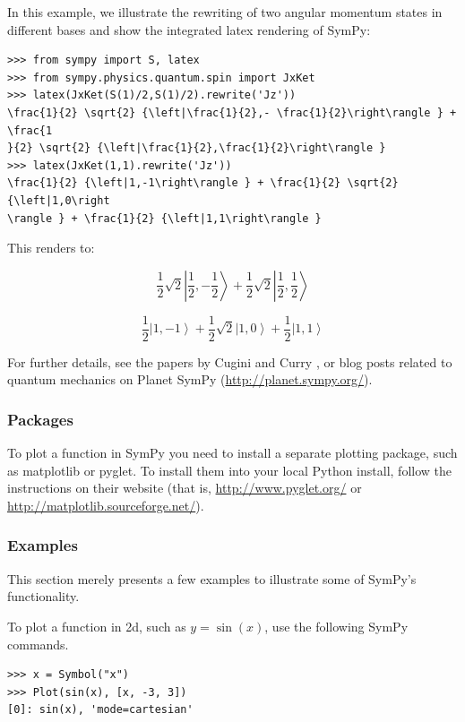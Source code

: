\documentclass[12pt]{article}
\begin{document}
In this example, we illustrate the rewriting of two angular momentum states in different
bases and show the integrated latex rendering of SymPy:

\begin{Verbatim}[fontsize=\scriptsize,fontfamily=courier,fontshape=tt,frame=single,label=SymPy]
>>> from sympy import S, latex
>>> from sympy.physics.quantum.spin import JxKet
>>> latex(JxKet(S(1)/2,S(1)/2).rewrite('Jz'))
\frac{1}{2} \sqrt{2} {\left|\frac{1}{2},- \frac{1}{2}\right\rangle } + \frac{1
}{2} \sqrt{2} {\left|\frac{1}{2},\frac{1}{2}\right\rangle }
>>> latex(JxKet(1,1).rewrite('Jz'))
\frac{1}{2} {\left|1,-1\right\rangle } + \frac{1}{2} \sqrt{2} {\left|1,0\right
\rangle } + \frac{1}{2} {\left|1,1\right\rangle }
\end{Verbatim}
This renders to:

\[
\frac{1}{2} \sqrt{2} {\left|\frac{1}{2},- \frac{1}{2}\right\rangle } + \frac{1
}{2} \sqrt{2} {\left|\frac{1}{2},\frac{1}{2}\right\rangle }
\]

\[
\frac{1}{2} {\left|1,-1\right\rangle } + \frac{1}{2} \sqrt{2} {\left|1,0\right
\rangle } + \frac{1}{2} {\left|1,1\right\rangle }
\]

For further details, see the papers by Cugini \cite{Cug}
and Curry \cite{Cur}, or blog posts related to quantum mechanics on
Planet SymPy (\url{http://planet.sympy.org/}).

\subsubsection{Packages}

To plot a function in SymPy you need to install a separate plotting
package, such as matplotlib or pyglet.
To install them into your local Python install, follow the
instructions on their website (that is,
\url{http://www.pyglet.org/} or
\url{http://matplotlib.sourceforge.net/}).

\subsubsection{Examples}

This section merely presents a few examples to illustrate some of
SymPy's functionality.

To plot a function in 2d, such as $y=\sin(x)$,
use the following SymPy commands.

\begin{Verbatim}[fontsize=\scriptsize,fontfamily=courier,fontshape=tt,frame=single,label=SymPy]
>>> x = Symbol("x")
>>> Plot(sin(x), [x, -3, 3])
[0]: sin(x), 'mode=cartesian'
\end{Verbatim}
\end{document}
